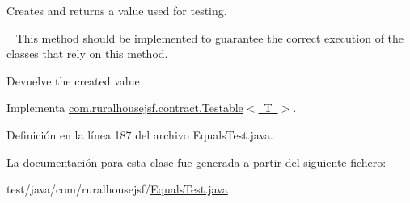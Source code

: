 Creates and returns a value used for testing. 

~\newline
 This method should be implemented to guarantee the correct execution of the classes that rely on this method.

\begin{DoxyReturn}{Devuelve}
the created value 
\end{DoxyReturn}


Implementa \mbox{\hyperlink{a00244_ae4546a381488faaba1ef7c0f8688de9c}{com.\+ruralhousejsf.\+contract.\+Testable$<$ T $>$}}.



Definición en la línea 187 del archivo Equals\+Test.\+java.



La documentación para esta clase fue generada a partir del siguiente fichero\+:\begin{DoxyCompactItemize}
\item 
test/java/com/ruralhousejsf/\mbox{\hyperlink{a00092}{Equals\+Test.\+java}}\end{DoxyCompactItemize}
